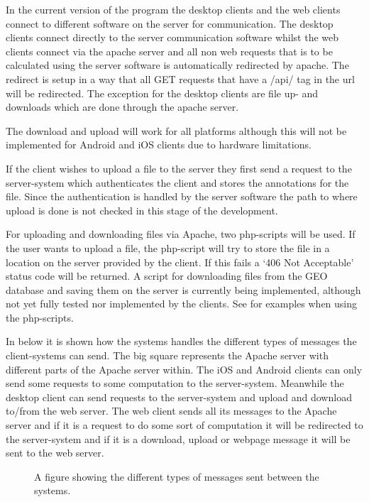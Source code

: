 In the current version of the program the desktop clients and the web clients connect to different software on the server for communication. The desktop clients connect directly to the server communication software whilst the web clients connect via the apache server and all non web requests that is to be calculated using the server software is automatically redirected by apache.
The redirect is setup in a way that all GET requests that have a /api/ tag in the url will be redirected.
The exception for the desktop clients are file up- and downloads which are done through the apache server.

The download and upload will work for all platforms although this will not be implemented for Android and iOS clients due to hardware limitations.

If the client wishes to upload a file to the server they first send a request to the server-system which authenticates the client and stores the annotations for the file. Since the authentication is handled by the server software the path to where upload is done is not checked in this stage of the development.

For uploading and downloading files via Apache, two php-scripts will be used. If the user wants to upload a file, the php-script will try to store the file in a location on the server provided by the client. If this fails a ‘406 Not Acceptable’ status code will be returned. A script for downloading files from the GEO database and saving them on the server is currently being  implemented, although not yet fully tested nor implemented by the clients. See  for examples when using the php-scripts.

In  below it is shown how the systems handles the different types of messages the client-systems can send. The big square represents the Apache server with different parts of the Apache server within. The iOS and Android clients can only send some requests to some computation to the server-system. Meanwhile the desktop client can send requests to the server-system and upload and download to/from the web server. The web client sends all its messages to the Apache server and if it is a request to do some sort of computation it will be redirected to the server-system and if it is a download, upload or webpage message it will be sent to the web server.

\begin{figure}[hbt]
\caption{A figure showing the different types of messages sent between the systems.}
\label{fig:exp_flow}
\end{figure}

